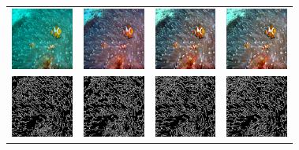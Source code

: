 \documentclass[letterpaper, 10pt, conference]{ieeeconf}
\begin{document}
\begin{figure}
\begin{tabular}{p{1.7cm} p{1.7cm} p{1.7cm} p{1.7cm}}
   \includegraphics[width=0.8in]{2_original} &
   \includegraphics[width=0.8in]{2_cimg} &
   \includegraphics[width=0.8in]{2_u0img} &
   \includegraphics[width=0.8in]{2_u1img} \\ [-1ex]
   \includegraphics[width=0.8in]{2_oedges} &
   \includegraphics[width=0.8in]{2_cedges} &
   \includegraphics[width=0.8in]{2_u0edges} &
   \includegraphics[width=0.8in]{2_u1edges} \\


\end{tabular}
\end{figure}
\end{document}
